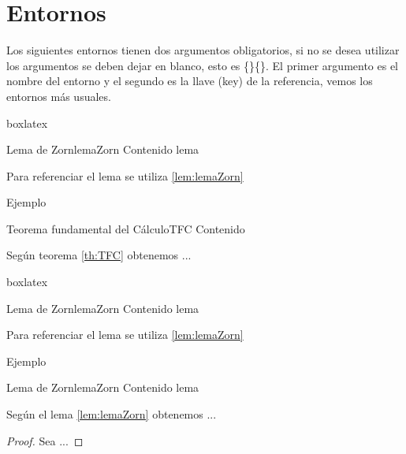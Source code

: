 {
	\justifying
	\chapter{Entornos}\label{cap:guiaDeUsuario}
	Los siguientes entornos tienen dos argumentos obligatorios, si no se desea utilizar los argumentos se deben dejar en blanco, esto es \{\}\{\}. El primer argumento es el nombre del entorno y el segundo es la llave (key) de la referencia, vemos los entornos más usuales. 
	\begin{tcblisting}{boxlatex}
		\begin{theorem}{Lema de Zorn}{lemaZorn}
			Contenido lema
		\end{theorem}
		Para referenciar el lema se utiliza \ref{lem:lemaZorn}
	\end{tcblisting}
	Ejemplo
	\begin{theorem}{Teorema fundamental del Cálculo}{TFC}
		Contenido
	\end{theorem}
	Según teorema	\ref{th:TFC} obtenemos ...
	
	\begin{tcblisting}{boxlatex}
		\begin{lemma}{Lema de Zorn}{lemaZorn}
			Contenido lema
		\end{lemma}
		Para referenciar el lema se utiliza \ref{lem:lemaZorn}
	\end{tcblisting}
	Ejemplo
	\begin{lemma}{Lema de Zorn}{lemaZorn}
		Contenido lema
	\end{lemma}
	Según el lema \ref{lem:lemaZorn} obtenemos ...
	\begin{proof}
		Sea ...
	\end{proof}
	
	\begin{example}{}{}
		\lipsum[1]
	\end{example}

	\begin{solution}
		\lipsum[1]
	\end{solution}
}
